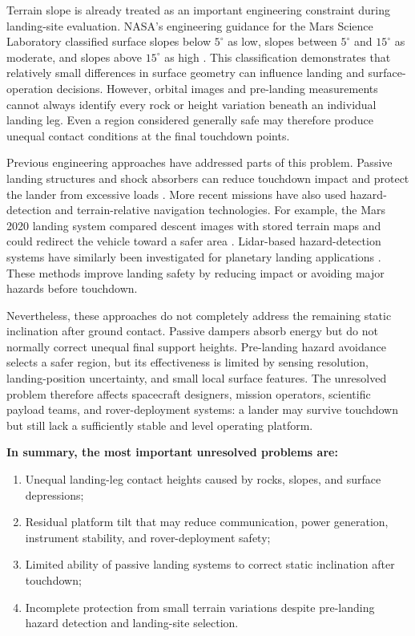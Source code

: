\documentclass{engr1000j-s2}
\begin{document}
Terrain slope is already treated as an important engineering constraint during landing-site evaluation. NASA's engineering guidance for the Mars Science Laboratory classified surface slopes below \(5^\circ\) as low, slopes between \(5^\circ\) and \(15^\circ\) as moderate, and slopes above \(15^\circ\) as high \cite{msl_engineering_guide}. This classification demonstrates that relatively small differences in surface geometry can influence landing and surface-operation decisions. However, orbital images and pre-landing measurements cannot always identify every rock or height variation beneath an individual landing leg. Even a region considered generally safe may therefore produce unequal contact conditions at the final touchdown points.

Previous engineering approaches have addressed parts of this problem. Passive landing structures and shock absorbers can reduce touchdown impact and protect the lander from excessive loads \cite{pham2013}. More recent missions have also used hazard-detection and terrain-relative navigation technologies. For example, the Mars 2020 landing system compared descent images with stored terrain maps and could redirect the vehicle toward a safer area \cite{nasa_trn2020}. Lidar-based hazard-detection systems have similarly been investigated for planetary landing applications \cite{huang2024}. These methods improve landing safety by reducing impact or avoiding major hazards before touchdown.

Nevertheless, these approaches do not completely address the remaining static inclination after ground contact. Passive dampers absorb energy but do not normally correct unequal final support heights. Pre-landing hazard avoidance selects a safer region, but its effectiveness is limited by sensing resolution, landing-position uncertainty, and small local surface features. The unresolved problem therefore affects spacecraft designers, mission operators, scientific payload teams, and rover-deployment systems: a lander may survive touchdown but still lack a sufficiently stable and level operating platform.

\medskip
\noindent\textbf{In summary, the most important unresolved problems are:}

\begin{enumerate}
    \item Unequal landing-leg contact heights caused by rocks, slopes, and surface depressions;
    \item Residual platform tilt that may reduce communication, power generation, instrument stability, and rover-deployment safety;
    \item Limited ability of passive landing systems to correct static inclination after touchdown;
    \item Incomplete protection from small terrain variations despite pre-landing hazard detection and landing-site selection.
\end{enumerate}
\end{document}
